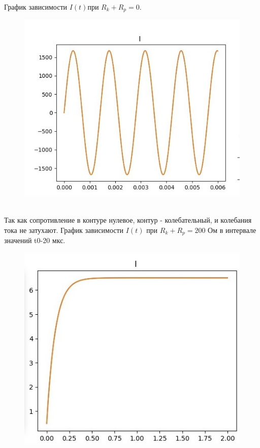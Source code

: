 \documentclass[a4paper, 12pt]{article}
\begin{document}
    График зависимости $I(t)$при $R_k + R_p = 0$.
	\begin{figure}[h]
		\centering
		\includegraphics[scale=0.6]{2}
	\end{figure}
	\\Так как сопротивление в контуре нулевое, контур - колебательный, и колебания тока не затухают.
\clearpage
\newpage
	График зависимости $I(t)$ при $R_k + R_p = 200$ Ом в интервале значений t0-20 мкс.
	\begin{figure}[h]
		\centering
		\includegraphics[scale=0.6]{3}
	\end{figure}
\end{document}

